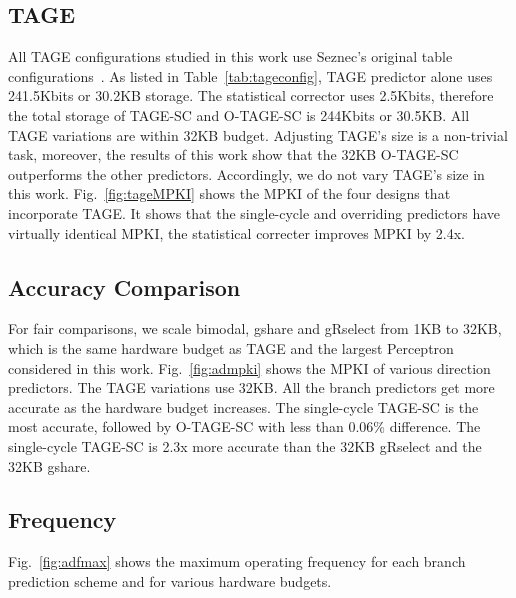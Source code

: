\subsection{TAGE}
\label{sec:eval:advanced:tage}
All TAGE configurations studied in this work use Seznec’s original table configurations~\cite{tage}. As listed in Table~\ref{tab:tageconfig}, TAGE predictor alone uses 241.5Kbits or \mytilde30.2KB storage. The statistical corrector uses 2.5Kbits, therefore the total storage of \mbox{TAGE-SC} and \mbox{O-TAGE-SC} is 244Kbits or 30.5KB. All TAGE variations are within 32KB budget. Adjusting TAGE's size is a non-trivial task, moreover, the results of this work show that the 32KB \mbox{O-TAGE-SC} outperforms the other predictors. Accordingly, we do not vary TAGE's size in this work. Fig.~\ref{fig:tageMPKI} shows the MPKI of the four designs that incorporate TAGE. It shows that the single-cycle and overriding predictors have virtually identical MPKI, the statistical correcter improves MPKI by \mytilde 2.4x.


\subsection{Accuracy Comparison}
\label{sec:eval:advanced:comparison}
For fair comparisons, we scale bimodal, gshare and gRselect from 1KB to 32KB, which is the same hardware budget as TAGE and the largest Perceptron considered in this work. Fig.~\ref{fig:admpki} shows the MPKI of various direction predictors. The TAGE variations use 32KB. All the branch predictors get more accurate as the hardware budget increases. The single-cycle \mbox{TAGE-SC} is the most accurate, followed by \mbox{O-TAGE-SC} with less than 0.06\% difference. The single-cycle \mbox{TAGE-SC} is \mytilde 2.3x more accurate than the 32KB gRselect and the 32KB gshare.

\subsection{Frequency}
\label{sec:eval:advanced:fmax}
Fig.~\ref{fig:adfmax} shows the maximum operating frequency for each branch prediction scheme and for various hardware budgets.

